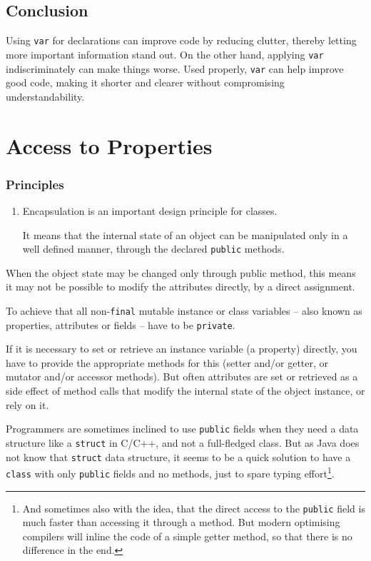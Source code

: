 
\subsection{Conclusion}
Using \lstinline|var| for declarations can improve code by reducing clutter, thereby letting more important information stand out. On the other hand, applying \lstinline|var| indiscriminately can make things worse. Used properly, \lstinline|var| can help improve good code, making it shorter and clearer without compromising understandability.


\section{Access to Properties}

\subsubsection{Principles}
\begin{enumerate}[label=P\arabic*.]
\item{Encapsulation is an important design principle for classes.

It means that the internal state of an object can be manipulated only in a well defined manner, through the declared \lstinline|public| methods.}
\end{enumerate}

When the object state may be changed only through public method, this means it may not be possible to modify the attributes directly, by a direct assignment.

To achieve that all non-\lstinline|final| mutable instance or class variables – also known as properties, attributes or fields – have to be \lstinline|private|.

If it is necessary to set or retrieve an instance variable (a property) directly, you have to provide the appropriate methods for this (setter and/or getter, or mutator and/or accessor methods). But often attributes are set or retrieved as a side effect of method calls that modify the internal state of the object instance, or rely on it.

Programmers are sometimes inclined to use \lstinline|public| fields when they need a data structure like a \lstinline|struct| in C/C++, and not a full-fledged class. But as Java does not know that \lstinline|struct| data structure, it seems to be a quick solution to have a \lstinline|class| with only \lstinline|public| fields and no methods, just to spare typing effort\footnote{And sometimes also with the idea, that the direct access to the \lstinline|public| field is much faster than accessing it through a method. But modern optimising compilers will inline the code of a simple getter method, so that there is no difference in the end.}.

